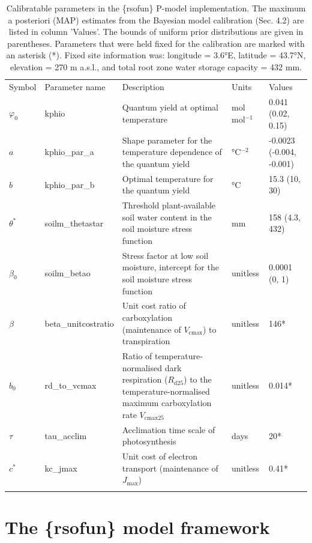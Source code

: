 \documentclass[gmd, manuscript]{copernicus}
\begin{document}
\begin{table}[t]
\caption{Calibratable parameters in the \{rsofun\} P-model implementation. The maximum a posteriori (MAP) estimates from the Bayesian model calibration (Sec. 4.2) are listed in column 'Values'. The bounds of uniform prior distributions are given in parentheses. Parameters that were held fixed for the calibration are marked with an asterisk (*). Fixed site information was: longitude = 3.6°E, latitude = 43.7°N, elevation = 270 m a.s.l., and total root zone water storage capacity = 432 mm.}
\begin{tabular}{lllll}
\tophline
Symbol & Parameter name & Description & Units & Values \\
\middlehline
$\varphi_0$ & kphio & Quantum yield at optimal temperature & mol mol$^{-1}$ & 0.041 (0.02, 0.15) \\
$a$ & kphio\_par\_a & Shape parameter for the temperature dependence of the quantum yield & °C$^{-2}$ & -0.0023 (-0.004, -0.001) \\
$b$ & kphio\_par\_b & Optimal temperature for the quantum yield & °C & 15.3 (10, 30) \\
$\theta^*$ & soilm\_thetastar & Threshold plant-available soil water content in the soil moisture stress function & mm & 158 (4.3, 432) \\
$\beta_0$ & soilm\_betao & Stress factor at low soil moisture, intercept for the soil moisture stress function & unitless & 0.0001 (0, 1) \\
$\beta$ & beta\_unitcostratio & Unit cost ratio of carboxylation (maintenance of $V_{\mathrm{cmax}}$) to transpiration & unitless & 146* \\
$b_0$ & rd\_to\_vcmax & Ratio of temperature-normalised dark respiration ($R_{\mathrm{d25}}$) to the temperature-normalised maximum carboxylation rate $V_{\mathrm{cmax25}}$ & unitless & 0.014* \\
$\tau$ & tau\_acclim & Acclimation time scale of photosynthesis & days & 20* \\
$c^*$ & kc\_jmax & Unit cost of electron transport (maintenance of $J_{\mathrm{max}}$) & unitless & 0.41* \\
\bottomhline
\end{tabular}
\belowtable{}
\end{table}

\section{The \{rsofun\} model framework}
\end{document}

